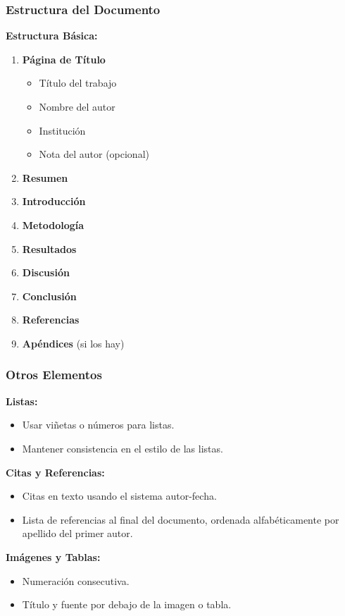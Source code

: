 \documentclass[
11pt, %
]{beamer}
\begin{document}
\begin{frame}
	\frametitle{Estructura del Documento}

	\textbf{Estructura Básica:}
	\begin{enumerate}
		\item \textbf{Página de Título}
		      \begin{itemize}
			      \item Título del trabajo
			      \item Nombre del autor
			      \item Institución
			      \item Nota del autor (opcional)
		      \end{itemize}
		\item \textbf{Resumen}
		\item \textbf{Introducción}
		\item \textbf{Metodología}
		\item \textbf{Resultados}
		\item \textbf{Discusión}
		\item \textbf{Conclusión}
		\item \textbf{Referencias}
		\item \textbf{Apéndices} (si los hay)
	\end{enumerate}

\end{frame}

\begin{frame}
	\frametitle{Otros Elementos}

	\textbf{Listas:}
	\begin{itemize}
		\item Usar viñetas o números para listas.
		\item Mantener consistencia en el estilo de las listas.
	\end{itemize}

	\textbf{Citas y Referencias:}
	\begin{itemize}
		\item Citas en texto usando el sistema autor-fecha.
		\item Lista de referencias al final del documento, ordenada alfabéticamente por apellido del primer autor.
	\end{itemize}

	\textbf{Imágenes y Tablas:}
	\begin{itemize}
		\item Numeración consecutiva.
		\item Título y fuente por debajo de la imagen o tabla.
	\end{itemize}

\end{frame}
\end{document}

